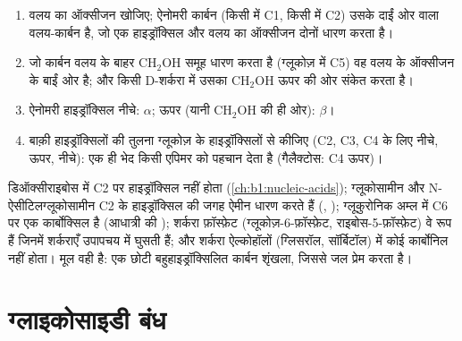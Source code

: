 \begin{method}[हावर्थ प्रक्षेप पढ़ना]\label{met:b1:carbohydrates:haworth}
\begin{enumerate}
  \item वलय का ऑक्सीजन खोजिए; ऐनोमरी कार्बन (किसी  में C1, किसी
         में C2) उसके दाईं ओर वाला वलय-कार्बन है, जो एक
        हाइड्रॉक्सिल और वलय का ऑक्सीजन दोनों धारण करता है।
  \item जो कार्बन वलय के बाहर $\mathrm{CH_2OH}$ समूह धारण करता है
        (ग्लूकोज़ में C5) वह वलय के ऑक्सीजन के बाईं ओर है; और किसी
        D-शर्करा में उसका $\mathrm{CH_2OH}$ ऊपर की ओर संकेत करता है।
  \item ऐनोमरी हाइड्रॉक्सिल नीचे: $\alpha$; ऊपर (यानी
        $\mathrm{CH_2OH}$ की ही ओर): $\beta$।
  \item बाक़ी हाइड्रॉक्सिलों की तुलना ग्लूकोज़ के हाइड्रॉक्सिलों से
        कीजिए (C2, C3, C4 के लिए नीचे, ऊपर, नीचे): एक ही भेद किसी एपिमर
        को पहचान देता है (गैलैक्टोस: C4 ऊपर)।
\end{enumerate}
\end{method}

\begin{example}[वे शर्कराएँ जो $(\mathrm{CH_2O})_n$ नहीं हैं]\label{ex:b1:carbohydrates:derivatives}
डिऑक्सीराइबोस में C2 पर हाइड्रॉक्सिल नहीं होता (\cref{ch:b1:nucleic-acids});
ग्लूकोसामीन और N-ऐसीटिलग्लूकोसामीन C2 के हाइड्रॉक्सिल की जगह ऐमीन
धारण करते हैं (, ); ग्लूकुरोनिक अम्ल में C6 पर एक
कार्बोक्सिल है (आधात्री की ); शर्करा फ़ॉस्फ़ेट
(ग्लूकोज़-6-फ़ॉस्फ़ेट, राइबोस-5-फ़ॉस्फ़ेट) वे रूप हैं जिनमें शर्कराएँ
उपापचय में घुसती हैं; और शर्करा ऐल्कोहॉलों (ग्लिसरॉल, सॉर्बिटॉल) में कोई
कार्बोनिल नहीं होता। मूल वही है: एक छोटी बहुहाइड्रॉक्सिलित कार्बन
शृंखला, जिससे जल प्रेम करता है।
\end{example}

\section{ग्लाइकोसाइडी बंध}


